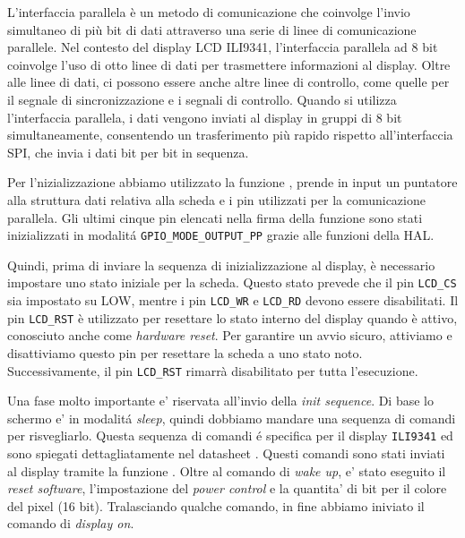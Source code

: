 \documentclass[a4paper]{article}
\begin{document}
L'interfaccia parallela è un metodo di comunicazione che coinvolge l'invio simultaneo di più bit di dati attraverso una serie di linee di comunicazione parallele. Nel contesto del display LCD ILI9341, l'interfaccia parallela ad 8 bit coinvolge l'uso di otto linee di dati per trasmettere informazioni al display. Oltre alle linee di dati, ci possono essere anche altre linee di controllo, come quelle per il segnale di sincronizzazione e i segnali di controllo. Quando si utilizza l'interfaccia parallela, i dati vengono inviati al display in gruppi di 8 bit simultaneamente, consentendo un trasferimento più rapido rispetto all'interfaccia SPI, che invia i dati bit per bit in sequenza.

Per l'nizializzazione abbiamo utilizzato la funzione {}, prende in input un puntatore alla struttura dati relativa alla scheda e i pin utilizzati per la comunicazione parallela. Gli ultimi cinque pin elencati nella firma della funzione sono stati inizializzati in modalitá \texttt{GPIO\_MODE\_OUTPUT\_PP} grazie alle funzioni della HAL.

Quindi, prima di inviare la sequenza di inizializzazione al display, è necessario impostare uno stato iniziale per la scheda. Questo stato prevede che il pin \texttt{LCD\_CS} sia impostato su LOW, mentre i pin \texttt{LCD\_WR} e \texttt{LCD\_RD} devono essere disabilitati. Il pin \texttt{LCD\_RST} è utilizzato per resettare lo stato interno del display quando è attivo, conosciuto anche come \textit{hardware reset}. Per garantire un avvio sicuro, attiviamo e disattiviamo questo pin per resettare la scheda a uno stato noto. Successivamente, il pin \texttt{LCD\_RST} rimarrà disabilitato per tutta l'esecuzione.

Una fase molto importante e' riservata all'invio della \textit{init sequence}.
Di base lo schermo e' in modalitá \textit{sleep}, quindi dobbiamo mandare una sequenza di comandi per risvegliarlo. Questa sequenza di comandi é specifica per il display \texttt{ILI9341} ed sono spiegati dettagliatamente nel datasheet \cite{ili9341}. Questi comandi sono stati inviati al display tramite la funzione {}. Oltre al comando di \textit{wake up}, e' stato eseguito il \textit{reset software}, l'impostazione del \textit{power control} e la quantita' di bit per il colore del pixel (16 bit). Tralasciando qualche comando, in fine abbiamo iniviato il comando di \textit{display on}.
\end{document}
